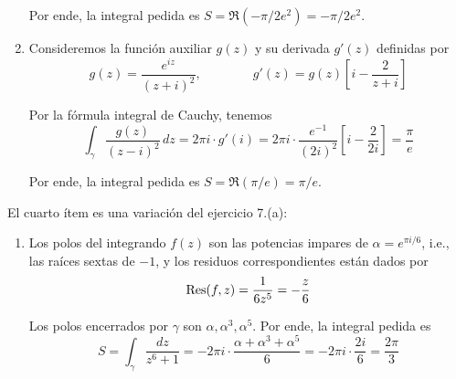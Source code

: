 \begin{solution}
\begin{enumerate}[label=(\alph*)]
    Por ende, la integral pedida es $S = \Re(-\pi/2e^2) = -\pi/2e^2$.
    
    \item Consideremos la función auxiliar $g(z)$ y su derivada $g'(z)$ definidas por
    $$
    g(z) = \frac {e^{iz}} {(z + i)^2}, \qquad \qquad
    g'(z) = g(z) \left[ i - \frac 2 {z + i} \right]
    $$
    
    Por la fórmula integral de Cauchy, tenemos
    $$
    \int_\gamma \frac {g(z)} {(z - i)^2} \, dz
        = 2\pi i \cdot g'(i)
        = 2\pi i \cdot \frac {e^{-1}} {(2i)^2} \left[ i - \frac 2 {2i} \right]
        = \frac \pi e
    $$
    
    Por ende, la integral pedida es $S = \Re(\pi/e) = \pi/e$.
\end{enumerate}
El cuarto ítem es una variación del ejercicio 7.(a):
\begin{enumerate}[label=(\alph*)]
    \setcounter {enumi} 3
    
    \item Los polos del integrando $f(z)$ son las potencias impares de $\alpha = e^{\pi i/6}$, i.e., las raíces sextas de $-1$, y los residuos correspondientes están dados por
    $$\operatorname{Res}(f, z) = \frac 1 {6z^5} = -\frac z6$$
    
    Los polos encerrados por $\gamma$ son $\alpha, \alpha^3, \alpha^5$. Por ende, la integral pedida es
    $$
    S
        = \int_\gamma \frac {dz} {z^6 + 1}
        = -2\pi i \cdot \frac {\alpha + \alpha^3 + \alpha^5} 6
        = -2\pi i \cdot \frac {2i} 6
        = \frac {2\pi} 3
    $$
\end{enumerate}
\end{solution}
